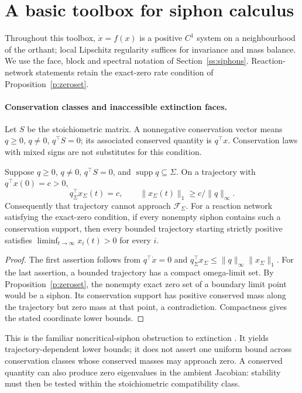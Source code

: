 \section{A basic toolbox for siphon calculus}
\label{ss:siphonToolbox}

Throughout this toolbox, $\dot x=f(x)$ is a positive $C^1$ system on a
neighbourhood of the orthant; local Lipschitz regularity suffices for
invariance and mass balance. We use the face, block and spectral notation
of Section~\ref{ss:siphons}. Reaction-network statements retain the
exact-zero rate condition of Proposition~\ref{p:zeroset}.

\paragraph{Conservation classes and inaccessible extinction faces.}
Let $S$ be the stoichiometric matrix. A nonnegative conservation vector
means $q\geq0$, $q\ne0$, $q^\top S=0$; its associated conserved quantity
is $q^\top x$. Conservation laws with mixed signs are not substitutes
for this condition.

\label{p:toolConservation}
Suppose $q\geq0$, $q\ne0$, $q^\top S=0$, and
$\operatorname{supp}q\subseteq\Sigma$. On a trajectory with
$q^\top x(0)=c>0$,
\[
 q_\Sigma^\top x_\Sigma(t)=c,
 \qquad \|x_\Sigma(t)\|_1\geq c/\|q\|_\infty.
\]
Consequently that trajectory cannot approach $\mathcal F_\Sigma$.
For a reaction network satisfying the exact-zero condition, if every
nonempty siphon contains such a conservation support, then every bounded
trajectory starting strictly positive satisfies
$\liminf_{t\to\infty}x_i(t)>0$ for every $i$.
\eeP
\begin{proof}
The first assertion follows from $q^\top\dot x=0$ and
$q_\Sigma^\top x_\Sigma\leq\|q\|_\infty\|x_\Sigma\|_1$.
For the last assertion, a bounded trajectory has a compact omega-limit
set. By Proposition~\ref{p:zeroset}, the nonempty exact zero set of a
boundary limit point would be a siphon. Its conservation support has
positive conserved mass along the trajectory but zero mass at that point,
a contradiction. Compactness gives the stated coordinate lower bounds.
\end{proof}
This is the familiar noncritical-siphon obstruction to extinction
\cite{AdLS,ShiuStu}. It yields trajectory-dependent lower bounds;
it does not assert one uniform bound across conservation classes whose
conserved masses may approach zero. A conserved quantity can also
produce zero eigenvalues in the ambient Jacobian: stability must then
be tested within the stoichiometric compatibility class.
\iffalse
